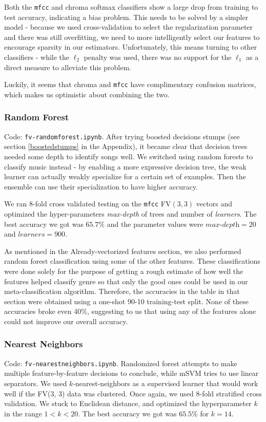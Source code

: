 \documentclass{article}
\begin{document}
Both the \texttt{mfcc} and chroma softmax classifiers show a large drop from training to test accuracy, indicating a bias problem. This needs to be solved by a simpler model - because we used cross-validation to select the regularization parameter and there was still overfitting, we need to more intelligently select our features to encourage sparsity in our estimators. Unfortunately, this means turning to other classifiers - while the $\ell_2$ penalty was used, there was no support for the $\ell_1$ as a direct measure to alleviate this problem.

Luckily, it seems that chroma and \texttt{mfcc} have complimentary confusion matrices, which makes us optimistic about combining the two.

\subsubsection{Random Forest}

Code: \texttt{fv-randomforest.ipynb}. After trying boosted decisions stumps (see section \ref{boostedstumps} in the Appendix), it became clear that decision trees needed some depth to identify songs well. We switched using random forests to classify music instead - by enabling a more expressive decision tree, the weak learner can actually weakly specialize for a certain set of examples. Then the ensemble can use their specialization to have higher accuracy.

We ran 8-fold cross validated testing on the \texttt{mfcc} FV$(3, 3)$ vectors and optimized
the hyper-parameters {\em max-depth} of trees and number of {\em learners}.
The best accuracy we got was $65.7\%$ and the parameter values were $\textit{max-depth} = 20$  and $\textit{learners} = 900$.

As mentioned in the Already-vectorized features section,
we also performed random forest classification using some of the other features.
These classifications were done solely for the purpose of getting a rough estimate
of how well the features helped classify genre so that only the good ones could
be used in our meta-classification algorithm.
Therefore, the accuracies in the table in that section were obtained using
a one-shot 90-10 training-test split.
None of these accuracies broke even 40\%, suggesting to us that using any of the features
alone could not improve our overall accuracy.

\subsubsection{Nearest Neighbors}
Code: \texttt{fv-nearestneighbors.ipynb}.
Randomized forest attempts to make multiple feature-by-feature decisions to conclude,
while mSVM tries to use linear separators.
We used $k$-nearest-neighbors as a supervised learner that would work well if the FV(3, 3) data was clustered.
Once again, we used 8-fold stratified cross validation.
We stuck to Euclidean distance, and optimized the hyperparameter $k$ in the range $1 < k < 20$.
The best accuracy we got was $65.5\%$ for $k = 14$.
\end{document}

